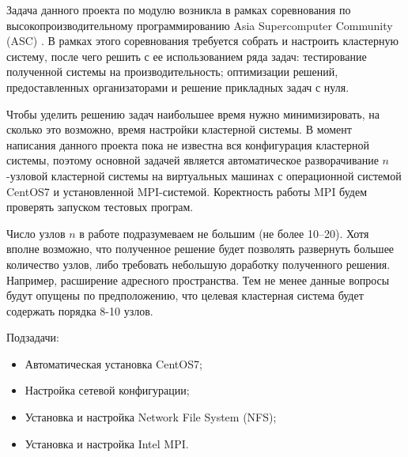 \Introduction

Задача данного проекта по модулю возникла в рамках соревнования по 
высокопроизводительному программированию Asia Supercomputer Community (ASC)
\cite{asc}. В рамках этого соревнования требуется собрать и настроить 
кластерную систему, после чего решить с ее использованием ряда задач:
тестирование полученной системы на производительность; оптимизации решений,
предоставленных организаторами и решение прикладных задач с нуля.

Чтобы уделить решению задач наибольшее время нужно минимизировать, на сколько
это возможно, время настройки кластерной системы. В момент написания
данного проекта пока не известна вся конфигурация кластерной системы, 
поэтому основной задачей является автоматическое разворачивание $n$-узловой
кластерной системы на виртуальных машинах с операционной системой 
\textmd{CentOS7} и установленной MPI-системой. Коректность работы MPI будем проверять
запуском тестовых програм.

Число узлов $n$ в работе подразумеваем не большим (не более 10--20). Хотя вполне 
возможно, что полученное решение будет позволять развернуть большее количество
узлов, либо требовать небольшую доработку полученного решения. Например, 
расширение адресного пространства. Тем не менее данные вопросы будут опущены 
по предположению, что целевая кластерная система будет содержать порядка 8-10 узлов.

Подзадачи:
\begin{itemize}
  \item Автоматическая установка \textmd{CentOS7};
  \item Настройка сетевой конфигурации;
  \item Установка и настройка Network File System (NFS)\cite{nfs};
  \item Установка и настройка Intel MPI.
\end{itemize}